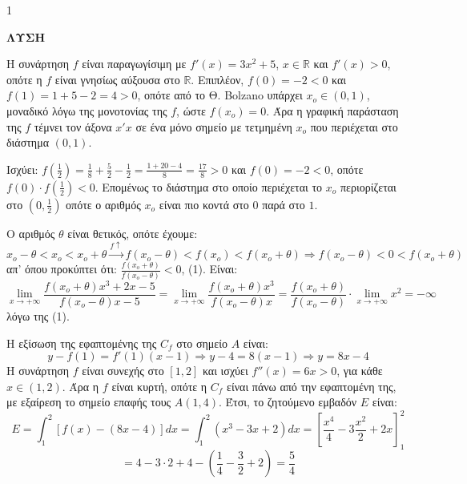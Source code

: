 \begin{ylh}{1}
    \item [Ύλη από εικόνα]
\end{ylh}
\textbf{ΛΥΣΗ}
\begin{alist}
    \item[α)]
    \begin{rlist}
        \item Η συνάρτηση $f$ είναι παραγωγίσιμη με $f'(x)=3x^2+5$, $x\in\mathbb{R}$ και $f'(x)>0$, οπότε η $f$ είναι γνησίως αύξουσα στο $\mathbb{R}$.
        Επιπλέον, $f(0)=-2<0$ και $f(1)=1+5-2=4>0$, οπότε από το Θ. Bolzano υπάρχει $x_o \in (0, 1)$, μοναδικό λόγω της μονοτονίας της $f$, ώστε $f(x_o)=0$. Άρα η γραφική παράσταση της $f$ τέμνει τον άξονα $x'x$ σε ένα μόνο σημείο με τετμημένη $x_o$ που περιέχεται στο διάστημα $(0, 1)$.

        \item Ισχύει: $f\left(\frac{1}{2}\right) = \frac{1}{8}+\frac{5}{2}-\frac{1}{2} = \frac{1+20-4}{8} = \frac{17}{8} > 0$ και $f(0)=-2<0$, οπότε $f(0)\cdot f\left(\frac{1}{2}\right) < 0$. Επομένως το διάστημα στο οποίο περιέχεται το $x_o$ περιορίζεται στο $\left(0, \frac{1}{2}\right)$ οπότε ο αριθμός $x_o$ είναι πιο κοντά στο $0$ παρά στο $1$.
    \end{rlist}

    \item[β)] Ο αριθμός $\theta$ είναι θετικός, οπότε έχουμε:
    \[ x_o-\theta < x_o < x_o+\theta \xrightarrow{f\uparrow} f(x_o-\theta) < f(x_o) < f(x_o+\theta) \Rightarrow f(x_o-\theta) < 0 < f(x_o+\theta) \]
    απ' όπου προκύπτει ότι: $\frac{f(x_o+\theta)}{f(x_o-\theta)} < 0$, (1).
    Είναι:
    \[ \lim_{x\to+\infty} \frac{f(x_o+\theta)x^3+2x-5}{f(x_o-\theta)x-5} = \lim_{x\to+\infty} \frac{f(x_o+\theta)x^3}{f(x_o-\theta)x} = \frac{f(x_o+\theta)}{f(x_o-\theta)} \cdot \lim_{x\to+\infty} x^2 = -\infty \]
    λόγω της (1).

    \item[γ)] Η εξίσωση της εφαπτομένης της $C_f$ στο σημείο $A$ είναι:
    \[ y-f(1)=f'(1)(x-1) \Rightarrow y-4=8(x-1) \Rightarrow y=8x-4 \]
    Η συνάρτηση $f$ είναι συνεχής στο $[1,2]$ και ισχύει $f''(x)=6x>0$, για κάθε $x\in(1,2)$. Άρα η $f$ είναι κυρτή, οπότε η $C_f$ είναι πάνω από την εφαπτομένη της, με εξαίρεση το σημείο επαφής τους $A(1, 4)$. Έτσι, το ζητούμενο εμβαδόν $E$ είναι:
    \[ E = \int_1^2 [f(x)-(8x-4)]dx = \int_1^2 (x^3-3x+2)dx = \left[\frac{x^4}{4}-3\frac{x^2}{2}+2x\right]_1^2 \]
    \[ = 4-3\cdot 2+4-\left(\frac{1}{4}-\frac{3}{2}+2\right)=\frac{5}{4} \]
\end{alist}